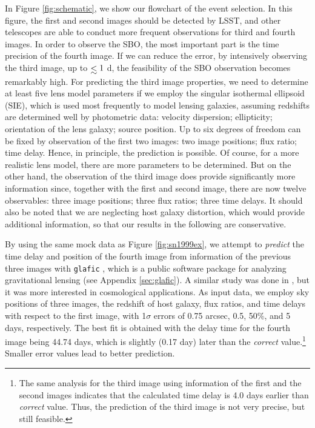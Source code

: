 \documentclass[useAMS,usenatbib,twocolumn]{mnras}
\def\lesssim{\mathrel{\hbox{\rlap{\hbox{\lower5pt\hbox{$\sim$}}}\hbox{$<$}}}}
\begin{document}
In Figure \ref{fig:schematic}, we show our flowchart of the event
selection. In this figure, the first and second images should be
detected by LSST, and other telescopes are able to conduct more
frequent observations for third and fourth images.  In order to
observe the SBO, the most important part is the time precision of the
fourth image. If we can reduce the error, by intensively observing the
third image, up to $\lesssim 1$ d, the feasibility of the SBO
observation becomes remarkably high. For predicting the third image
properties, we need to determine at least five lens model parameters
if we employ the singular isothermal ellipsoid (SIE), which is used
most frequently to model lensing galaxies, assuming redshifts are
determined well by photometric data: velocity dispersion; ellipticity;
orientation of the lens galaxy; source position. Up to six degrees of
freedom can be fixed by observation of the first two images: two image
positions; flux ratio; time delay. Hence, in principle, the prediction
is possible.  Of course, for a more realistic lens model, there are
more parameters to be determined. But on the other hand, the
observation of the third image does provide significantly more
information since, together with the first and second image, there are
now twelve observables: three image positions; three flux ratios;
three time delays.
%
It should also be noted that we are neglecting host galaxy distortion,
which would provide additional information, so that our results in the
following are conservative.

By using the same mock data as Figure \ref{fig:sn1999ex}, we attempt
to {\it predict} the time delay and position of the fourth image from
information of the previous three images with {\tt glafic}
\citep{ogur10b}, which is a public software package for analyzing
gravitational lensing (see Appendix \ref{sec:glafic}). A similar study
was done in \citet{ogur03}, but it was more interested in cosmological
applications. As input data, we employ sky positions of three images,
the redshift of host galaxy, flux ratios, and time delays with respect
to the first image, with 1$\sigma$ errors of 0.75 arcsec, 0.5, 50\%,
and 5 days, respectively. The best fit is obtained with the delay time
for the fourth image being 44.74 days, which is slightly (0.17 day)
later than the {\it correct} value.\footnote{The same analysis for the
  third image using information of the first and the second images
  indicates that the calculated time delay is 4.0 days earlier than
  {\it correct} value. Thus, the prediction of the third image is not
  very precise, but still feasible.}  Smaller error values lead to
better prediction.
\end{document}

